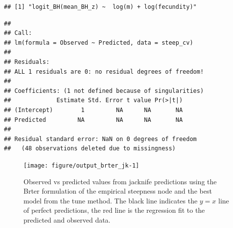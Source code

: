 \documentclass{dragonfly-report}
\begin{document}
\begin{knitrout}
\color{fgcolor}\begin{kframe}
\begin{alltt}
\hlopt{$}
\end{alltt}
\begin{verbatim}
## [1] "logit_BH(mean_BH_z) ~  log(m) + log(fecundity)"
\end{verbatim}
\begin{alltt}
 \hlkwb{<-}  \hlopt{~}   
\end{alltt}
\begin{verbatim}
## 
## Call:
## lm(formula = Observed ~ Predicted, data = steep_cv)
## 
## Residuals:
## ALL 1 residuals are 0: no residual degrees of freedom!
## 
## Coefficients: (1 not defined because of singularities)
##             Estimate Std. Error t value Pr(>|t|)
## (Intercept)        1         NA      NA       NA
## Predicted         NA         NA      NA       NA
## 
## Residual standard error: NaN on 0 degrees of freedom
##   (48 observations deleted due to missingness)
\end{verbatim}
\begin{alltt}
  \hlstd{=} \hlstd{,}  \hlstd{=} \hlstd{(}\hlstd{,} \hlstd{),}  \hlstd{=} \hlstd{(}\hlstd{,}
    \hlstd{))}
\end{alltt}
\end{kframe}\begin{figure}[]

\texttt{[image: figure/output\_brter\_jk-1]} \caption[Observed vs predicted values from jacknife predictions using the Brter formulation of the empirical steepness node and the best model from the tune method]{Observed vs predicted values from jacknife predictions using the Brter formulation of the empirical steepness node and the best model from the tune method. The black line indicates the $y=x$ line of perfect predictions, the red line is the regression fit to the predicted and observed data.\label{fig:output_brter_jk}}
\end{figure}

\begin{kframe}\begin{alltt}
\hlopt{$}\hlstd{coeff[}\hlstd{], lm_pred_steep}\hlopt{$}\hlstd{coeff[}\hlstd{],}
     \hlstd{=} \hlstd{,}  \hlstd{=} \hlstd{)}
\end{alltt}


{\ttfamily\noindent\bfseries\color{errorcolor}{\#\# Error in int\_abline(a = a, b = b, h = h, v = v, untf = untf, ...): 'a' and 'b' must be finite}}\begin{alltt}
\hlstd{(}\hlstd{,} \hlstd{,}  \hlstd{=} \hlstd{)}
\end{alltt}
\end{kframe}
\end{knitrout}
\end{document}
